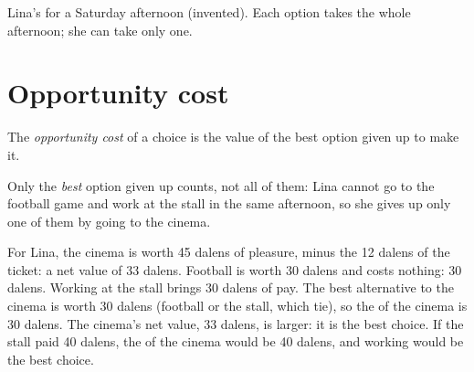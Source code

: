 \begin{omfigure}

{\small Lina's  for a Saturday afternoon (invented). Each option takes the
whole afternoon; she can take only one.}
\end{omfigure}

\section{Opportunity cost}

\begin{definition}\label{def:g7:scarcity-and-opportunity-cost:opportunity-cost}
The \emph{opportunity cost} of a choice is the value of the
best option given up to make it.
\end{definition}

Only the \emph{best} option given up counts, not all of them: Lina cannot go to
the football game and work at the stall in the same afternoon, so she gives up only
one of them by going to the cinema.

\begin{example}
For Lina, the cinema is worth 45 dalens of pleasure, minus the 12 dalens of the
ticket: a net value of 33 dalens. Football is worth 30 dalens and costs nothing:
30 dalens. Working at the stall brings 30 dalens of pay. The best alternative to
the cinema is worth 30 dalens (football or the stall, which tie), so the  of the cinema is 30 dalens. The cinema's net value, 33 dalens, is larger: it
is the best choice. If the stall paid 40 dalens, the  of the
cinema would be 40 dalens, and working would be the best choice.
\end{example}

